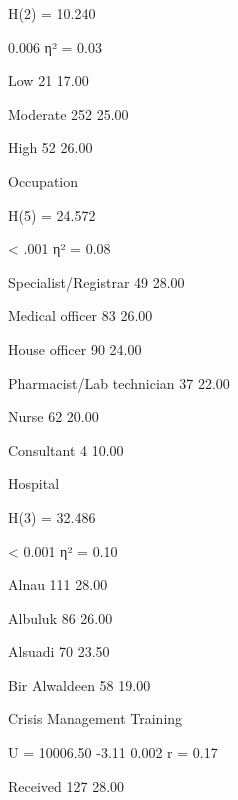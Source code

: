 H(2) = 10.240

0.006
η² = 0.03

   Low
21
17.00





   Moderate
252
25.00





   High
52
26.00





Occupation


H(5) = 24.572

< .001
η² = 0.08

   Specialist/Registrar
49
28.00





   Medical officer
83
26.00





   House officer
90
24.00





   Pharmacist/Lab technician
37
22.00





   Nurse
62
20.00





   Consultant
4
10.00





Hospital


H(3) = 32.486

< 0.001
η² = 0.10

   Alnau
111
28.00





   Albuluk
86
26.00





   Alsuadi
70
23.50





   Bir Alwaldeen
58
19.00





Crisis Management Training


U = 10006.50
-3.11
0.002
r = 0.17

   Received
127
28.00





